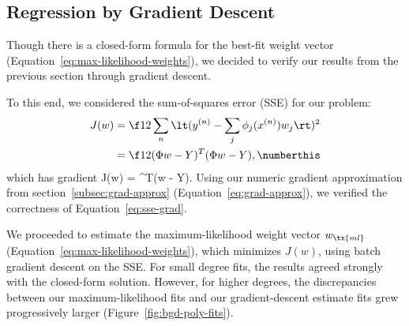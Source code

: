 \documentclass{article}
\begin{document}
\begin{multicols}{2}
\subsection{Regression by Gradient Descent}

Though there is a closed-form formula for the best-fit weight vector (Equation~\ref{eq:max-likelihood-weights}), we decided to verify our results from the previous section through gradient descent.

To this end, we considered the sum-of-squares error (SSE) for our problem:
\begin{align*}
J(w) &= \f12 \sum_n \lt(y^{(n)} - \sum_j\phi_j(x^{(n)}) w_j\rt)^2 \\
&= \f12 (\Phi w - Y)^T(\Phi w - Y), \label{eq:sse}\numberthis
\end{align*}
which has gradient
\beq
\label{eq:sse-grad}
\nabla J(w) = \Phi^T(\Phi w - Y).
\eeq
Using our numeric gradient approximation from section~\ref{subsec:grad-approx} (Equation~\ref{eq:grad-approx}), we verified the correctness of Equation~\ref{eq:sse-grad}.

We proceeded to estimate the maximum-likelihood weight vector $w_\tx{ml}$ (Equation~\ref{eq:max-likelihood-weights}), which minimizes $J(w)$, using batch gradient descent on the SSE.
For small degree fits, the results agreed strongly with the closed-form solution.
However, for higher degrees, the discrepancies between our maximum-likelihood fits and our gradient-descent estimate fits grew progressively larger (Figure~\ref{fig:bgd-poly-fits}).


\end{multicols}
\end{document}
